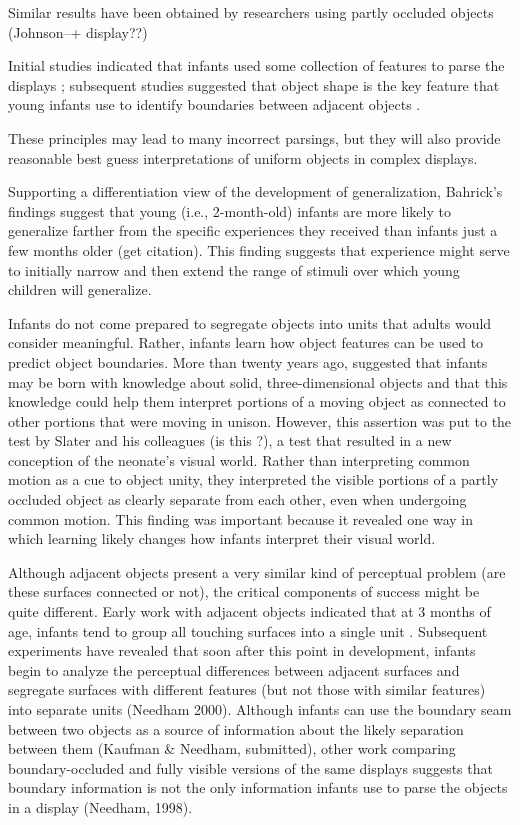 Similar results have been obtained by researchers using partly
occluded objects (Johnson--+ display??)

Initial studies indicated that infants used some collection of
features to parse the displays \cite{needham98infants,needham97object,needham98effects}; subsequent studies suggested that object shape is the key
feature that young infants use to identify boundaries between adjacent
objects \cite{needham99role}.

These principles may lead to many incorrect parsings, but they will
also provide reasonable best guess interpretations of uniform objects
in complex displays.  


Supporting a differentiation view of the development of
generalization, Bahrick's findings suggest that young (i.e.,
2-month-old) infants are more likely to generalize farther from the
specific experiences they received than infants just a few months
older (get citation).  This finding suggests that experience might
serve to initially narrow and then extend the range of stimuli over
which young children will generalize.


Infants do not come prepared to segregate objects into units that
adults would consider meaningful.  Rather, infants learn how object
features can be used to predict object boundaries.  More than twenty
years ago,  suggested that infants may be born
with knowledge about solid, three-dimensional objects and that this
knowledge could help them interpret portions of a moving object as
connected to other portions that were moving in unison.  However, this
assertion was put to the test by Slater and his colleagues (is this
?), a test that resulted in a new conception of
the neonate's visual world.  Rather than interpreting common motion as
a cue to object unity, they interpreted the visible portions of a
partly occluded object as clearly separate from each other, even when
undergoing common motion.  This finding was important because it
revealed one way in which learning likely changes how infants
interpret their visual world.


Although adjacent objects present a very similar kind of perceptual
problem (are these surfaces connected or not), the critical components
of success might be quite different.  Early work with adjacent objects
indicated that at 3 months of age, infants tend to group all touching
surfaces into a single unit \cite{kestenbaum87perception}.
Subsequent experiments have revealed that soon after this point in
development, infants begin to analyze the perceptual differences
between adjacent surfaces and segregate surfaces with different
features (but not those with similar features) into separate units
(Needham 2000).  Although infants can use the boundary seam between
two objects as a source of information about the likely separation
between them (Kaufman \& Needham, submitted), other work comparing
boundary-occluded and fully visible versions of the same displays
suggests that boundary information is not the only information infants
use to parse the objects in a display (Needham, 1998).  

